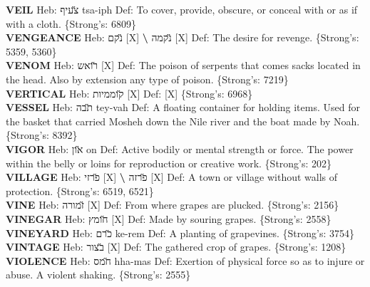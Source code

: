 {\textbf{VEIL} Heb: {\large\H צעיף} tsa-iph Def: To cover, provide, obscure, or conceal with or as if with a cloth. \{Strong's: 6809\}\hfill{}\\

\textbf{VENGEANCE} Heb: {\large\H נקם} {[}X{]} \textbf{\textbackslash{}} {\large\H נקמה} {[}X{]} Def: The desire for revenge. \{Strong's: 5359, 5360\}\hfill{}\\

\textbf{VENOM} Heb: {\large\H רואש} {[}X{]} Def: The poison of serpents that comes sacks located in the head. Also by extension any type of poison. \{Strong's: 7219\}\hfill{}\\

\textbf{VERTICAL} Heb: {\large\H קוממיות} {[}X{]} Def: {[}X{]} \{Strong's: 6968\}\hfill{}\\

\textbf{VESSEL} Heb: {\large\H תבה} tey-vah Def: A floating container for holding items. Used for the basket that carried Mosheh down the Nile river and the boat made by Noah. \{Strong's: 8392\}\hfill{}\\

\textbf{VIGOR} Heb: {\large\H און} on Def: Active bodily or mental strength or force. The power within the belly or loins for reproduction or creative work. \{Strong's: 202\}\hfill{}\\

\textbf{VILLAGE} Heb: {\large\H פרזי} {[}X{]} \textbf{\textbackslash{}} {\large\H פרזה} {[}X{]} Def: A town or village without walls of protection. \{Strong's: 6519, 6521\}\hfill{}\\

\textbf{VINE} Heb: {\large\H זמורה} {[}X{]} Def: From where grapes are plucked. \{Strong's: 2156\}\hfill{}\\

\textbf{VINEGAR} Heb: {\large\H חומץ} {[}X{]} Def: Made by souring grapes. \{Strong's: 2558\}\hfill{}\\

\textbf{VINEYARD} Heb: {\large\H כרם} ke-rem Def: A planting of grapevines. \{Strong's: 3754\}\hfill{}\\

\textbf{VINTAGE} Heb: {\large\H בצור} {[}X{]} Def: The gathered crop of grapes. \{Strong's: 1208\}\hfill{}\\

\textbf{VIOLENCE} Heb: {\large\H חמס} hha-mas Def: Exertion of physical force so as to injure or abuse. A violent shaking. \{Strong's: 2555\}\hfill{}\\

}
